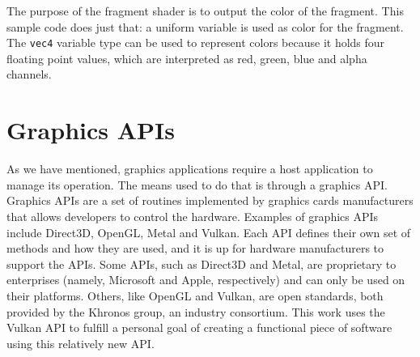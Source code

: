 The purpose of the fragment shader is to output the color of the fragment. This sample code does just that: a uniform variable is used as color for the fragment. The \texttt{vec4} variable type can be used to represent colors because it holds four floating point values, which are interpreted as red, green, blue and alpha channels.

\section{Graphics APIs}
As we have mentioned, graphics applications require a host application to manage its operation. The means used to do that is through a graphics API. Graphics APIs are a set of routines implemented by graphics cards manufacturers that allows developers to control the hardware. Examples of graphics APIs include Direct3D, OpenGL, Metal and Vulkan. Each API defines their own set of methods and how they are used, and it is up for hardware manufacturers to support the APIs. Some APIs, such as Direct3D and Metal, are proprietary to enterprises (namely, Microsoft and Apple, respectively) and can only be used on their platforms. Others, like OpenGL and Vulkan, are open standards, both provided by the Khronos group, an industry consortium. This work uses the Vulkan API to fulfill a personal goal of creating a functional piece of software using this relatively new API.



%
%
